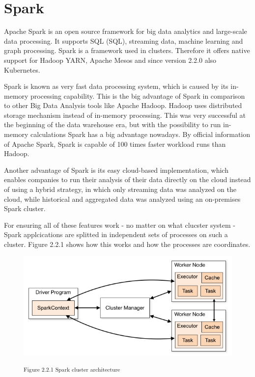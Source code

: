 
\section{Spark}

Apache Spark is an open source framework for big data analytics and large-scale data processing. It supports \acs{SQL} (\acl{SQL}), streaming data, machine learning and graph processing. Spark is a framework used in clusters. Therefore it offers native support for Hadoop YARN, Apache Mesos and since version 2.2.0 also Kubernetes.


Spark is known as very fast data processing system, which is caused by its in-memory processing capability. This is the big advantage of Spark in comparison to other Big Data Analysis tools like Apache Hadoop. Hadoop uses distributed storage mechanism instead of in-memory processing. This was very successful at the beginning of the data warehouse era, but with the possibility to run in-memory calculations Spark has a big advantage nowadays. By official information of Apache Spark, Spark is capable of 100 times faster workload runs than Hadoop.


Another advantage of Spark is its easy cloud-based implementation, which enables companies to run their analysis of their data directly on the cloud instead of using a hybrid strategy, in which only streaming data was analyzed on the cloud, while historical and aggregated data was analyzed using an on-premises Spark cluster.


For ensuring all of these features work - no matter on what clucster system - Spark applcications are splitted in independent sets of processes on such a cluster. Figure 2.2.1 shows how this works and how the processes are coordinates.

\begin{figure}[h]
\centering
\includegraphics[width=\textwidth/4*3]{images/spark_cluster_architecture.png}

\textsuperscript{Figure 2.2.1 Spark cluster architecture}
\end{figure}

